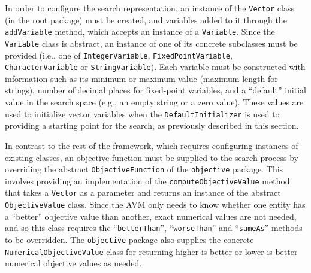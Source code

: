 \documentclass{llncs}
\newcommand{\inlineheading}[1]{\vspace{1mm} \noindent {\bf #1.}}
\begin{document}
\begin{sloppypar}
\inlineheading{Representation} In order to configure the search representation, an instance of the {\tt Vector} class (in the root package) must be created, and variables added to it through the {\tt addVariable} method, which accepts an instance of a {\tt Variable}. Since the {\tt Variable} class is abstract, an instance of one of its concrete subclasses must be provided (i.e., one of {\tt IntegerVariable}, {\tt FixedPointVariable}, {\tt CharacterVariable} or {\tt StringVariable}). Each variable must be constructed with information such as its minimum or maximum value (maximum length for strings), number of decimal places for fixed-point variables, and a ``default'' initial value in the search space (e.g., an empty string or a zero value). These values are used to initialize vector variables when the {\tt DefaultInitializer} is used to providing a starting point for the search, as previously described in this section.
\end{sloppypar}


\begin{sloppypar} \inlineheading{Objective Function} In contrast to the rest of the framework, which requires configuring instances of existing classes, an objective function must be supplied to the search process by overriding the abstract {\tt ObjectiveFunction} of the {\tt objective} package. This involves providing an implementation of the {\tt computeObjectiveValue} method that takes a {\tt Vector} as a parameter and returns an instance of the abstract {\tt ObjectiveValue} class. Since the AVM only needs to know whether one entity has a ``better'' objective value than another, exact numerical values are not needed, and so this class requires the ``{\tt betterThan}'', ``{\tt worseThan}'' and ``{\tt sameAs}'' methods to be overridden.
The {\tt objective} package also supplies the concrete {\tt NumericalObjectiveValue} class for returning higher-is-better or lower-is-better numerical objective values as needed.
\end{sloppypar}
\end{document}
